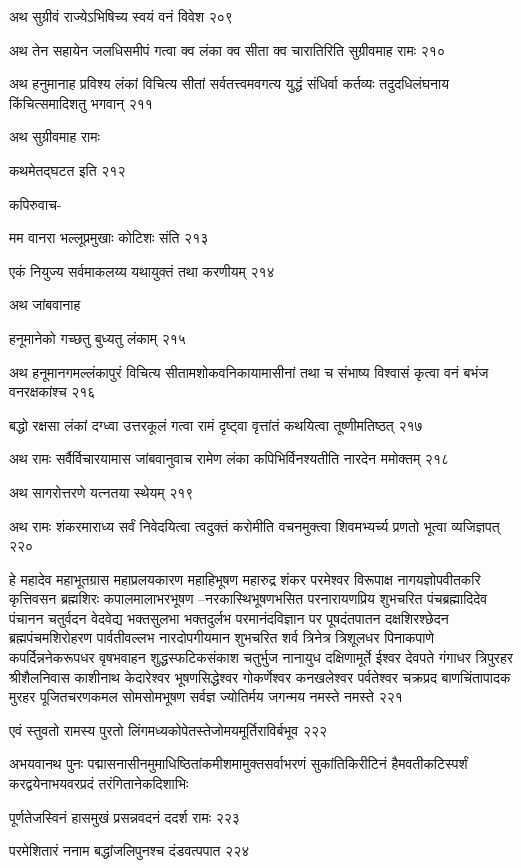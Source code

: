 अथ सुग्रीवं राज्येऽभिषिच्य स्वयं वनं विवेश २०९

अथ तेन सहायेन जलधिसमीपं गत्वा क्व लंका क्व सीता क्व चारातिरिति सुग्रीवमाह रामः २१०

अथ हनुमानाह प्रविश्य लंकां विचित्य सीतां सर्वतत्त्वमवगत्य युद्धं संधिर्वा कर्तव्यः
तदुदधिलंघनाय किंचित्समादिशतु भगवान् २११

अथ सुग्रीवमाह रामः

कथमेतद्घटत इति २१२

कपिरुवाच-

मम वानरा भल्लूप्रमुखाः कोटिशः संति २१३

एकं नियुज्य सर्वमाकलय्य यथायुक्तं तथा करणीयम् २१४

अथ जांबवानाह

हनूमानेको गच्छतु बुध्यतु लंकाम् २१५

अथ हनूमानगमल्लंकापुरं विचित्य सीतामशोकवनिकायामासीनां तथा च संभाष्य विश्वासं कृत्वा वनं
बभंज वनरक्षकांश्च २१६

बद्धो रक्षसा लंकां दग्ध्वा उत्तरकूलं गत्वा रामं दृष्ट्वा वृत्तांतं कथयित्वा तूष्णीमतिष्ठत् २१७

अथ रामः सर्वैर्विचारयामास जांबवानुवाच रामेण लंका कपिभिर्विनश्यतीति नारदेन ममोक्तम्
२१८

अथ सागरोत्तरणे यत्नतया स्थेयम् २१९

अथ रामः शंकरमाराध्य सर्वं निवेदयित्वा त्वदुक्तं करोमीति वचनमुक्त्वा शिवमभ्यर्च्य प्रणतो
भूत्वा व्यजिज्ञपत् २२०

हे महादेव महाभूतग्रास महाप्रलयकारण महाहिभूषण महारुद्र शंकर परमेश्वर विरूपाक्ष
नागयज्ञोपवीतकरि कृत्तिवसन ब्रह्मशिरः कपालमालाभरभूषण –नरकास्थिभूषणभसित
परनारायणप्रिय शुभचरित पंचब्रह्मादिदेव पंचानन चतुर्वदन वेदवेद्य भक्तसुलभा भक्तदुर्लभ
परमानंदविज्ञान पर पूषदंतपातन दक्षशिरश्छेदन ब्रह्मपंचमशिरोहरण पार्वतीवल्लभ
नारदोपगीयमान शुभचरित शर्व त्रिनेत्र त्रिशूलधर पिनाकपाणे कपर्दिन्ननेकरूपधर वृषभवाहन
शुद्धस्फटिकसंकाश चतुर्भुज नानायुध दक्षिणामूर्ते ईश्वर देवपते गंगाधर त्रिपुरहर श्रीशैलनिवास
काशीनाथ केदारेश्वर भूषणसिद्धेश्वर गोकर्णेश्वर कनखलेश्वर पर्वतेश्वर चक्रप्रद बाणचिंतापादक
मुरहर पूजितचरणकमल सोमसोमभूषण सर्वज्ञ ज्योतिर्मय जगन्मय नमस्ते नमस्ते २२१

एवं स्तुवतो रामस्य पुरतो लिंगमध्यकोपेतस्तेजोमयमूर्तिराविर्बभूव २२२

अभयवानथ पुनः पद्मासनासीनमुमाधिष्ठितांकमीशमामुक्तसर्वाभरणं सुकांतिकिरीटिनं
हैमवतीकटिस्पर्शं करद्वयेनाभयवरप्रदं तरंगितानेकदिशाभिः

पूर्णतेजस्विनं हासमुखं प्रसन्नवदनं ददर्श रामः २२३

परमेशितारं ननाम बद्धांजलिपुनश्च दंडवत्पपात २२४

